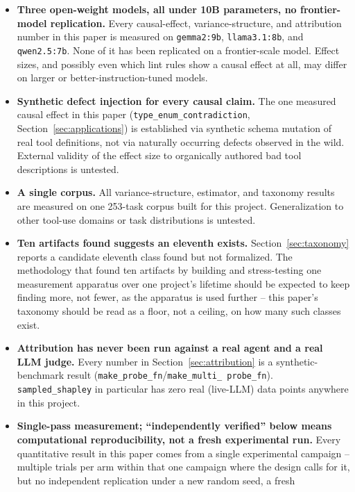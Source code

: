 \documentclass[11pt]{article}
\begin{document}
\begin{itemize}
\item \textbf{Three open-weight models, all under 10B parameters, no frontier-model
  replication.} Every causal-effect, variance-structure, and attribution number in this paper is
  measured on \texttt{gemma2:9b}, \texttt{llama3.1:8b}, and \texttt{qwen2.5:7b}. None of it has
  been replicated on a frontier-scale model. Effect sizes, and possibly even which lint rules show
  a causal effect at all, may differ on larger or better-instruction-tuned models.
\item \textbf{Synthetic defect injection for every causal claim.} The one measured causal effect
  in this paper (\texttt{type\_enum\_contradiction}, Section~\ref{sec:applications}) is established
  via synthetic schema mutation of real tool definitions, not via naturally occurring defects
  observed in the wild. External validity of the effect size to organically authored bad tool
  descriptions is untested.
\item \textbf{A single corpus.} All variance-structure, estimator, and taxonomy results are
  measured on one 253-task corpus built for this project. Generalization to other tool-use domains
  or task distributions is untested.
\item \textbf{Ten artifacts found suggests an eleventh exists.} Section~\ref{sec:taxonomy}
  reports a candidate eleventh class found but not formalized. The methodology that found ten
  artifacts by building and stress-testing one measurement apparatus over one project's lifetime
  should be expected to keep finding more, not fewer, as the apparatus is used further -- this
  paper's taxonomy should be read as a floor, not a ceiling, on how many such classes exist.
\item \textbf{Attribution has never been run against a real agent and a real LLM judge.} Every
  number in Section~\ref{sec:attribution} is a synthetic-benchmark result
  (\texttt{make\_\allowbreak probe\_\allowbreak fn}/\texttt{make\_\allowbreak multi\_\allowbreak
  probe\_\allowbreak fn}). \texttt{sampled\_\allowbreak shapley} in
  particular has zero real (live-LLM) data points anywhere in this project.
\item \textbf{Single-pass measurement; ``independently verified'' below means computational
  reproducibility, not a fresh experimental run.} Every quantitative result in this paper comes
  from a single experimental campaign -- multiple trials per arm within that one campaign where
  the design calls for it, but no independent replication under a new random seed, a fresh

\end{itemize}
\end{document}
